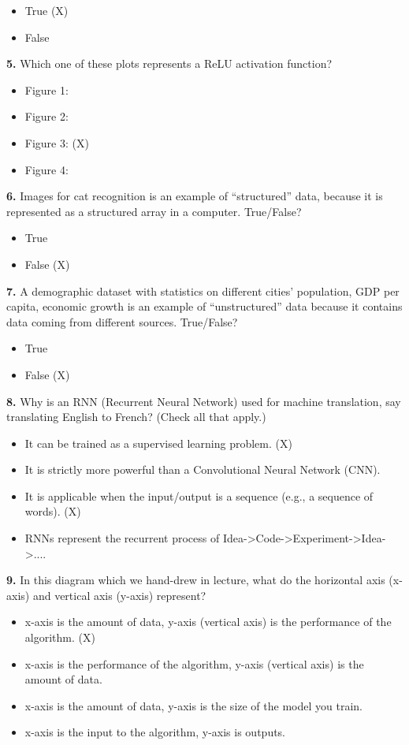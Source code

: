 \begin{itemize}
    \item True (X)
    \item False
\end{itemize}
\textbf{5.} Which one of these plots represents a ReLU activation function?
\begin{itemize}
    \item Figure 1:
    \item Figure 2:
    \item Figure 3: (X)
    \item Figure 4:
\end{itemize}
\textbf{6.} Images for cat recognition is an example of “structured” data, because it is represented as a structured array in a computer. True/False?
\begin{itemize}
    \item True
    \item False (X)
\end{itemize}
\textbf{7.} A demographic dataset with statistics on different cities' population, GDP per capita, economic growth is an example of “unstructured” data because it contains data coming from different sources. True/False?
\begin{itemize}
    \item True
    \item False (X)
\end{itemize}
\textbf{8.} Why is an RNN (Recurrent Neural Network) used for machine translation, say translating English to French? (Check all that apply.)
\begin{itemize}
    \item It can be trained as a supervised learning problem. (X)
    \item It is strictly more powerful than a Convolutional Neural Network (CNN).
    \item It is applicable when the input/output is a sequence (e.g., a sequence of words). (X)
    \item RNNs represent the recurrent process of Idea->Code->Experiment->Idea->....
\end{itemize}
\textbf{9.} In this diagram which we hand-drew in lecture, what do the horizontal axis (x-axis) and vertical axis (y-axis) represent?
\begin{itemize}
    \item x-axis is the amount of data, y-axis (vertical axis) is the performance of the algorithm. (X)
    \item x-axis is the performance of the algorithm, y-axis (vertical axis) is the amount of data.
    \item x-axis is the amount of data, y-axis is the size of the model you train.
    \item x-axis is the input to the algorithm, y-axis is outputs.
\end{itemize}
